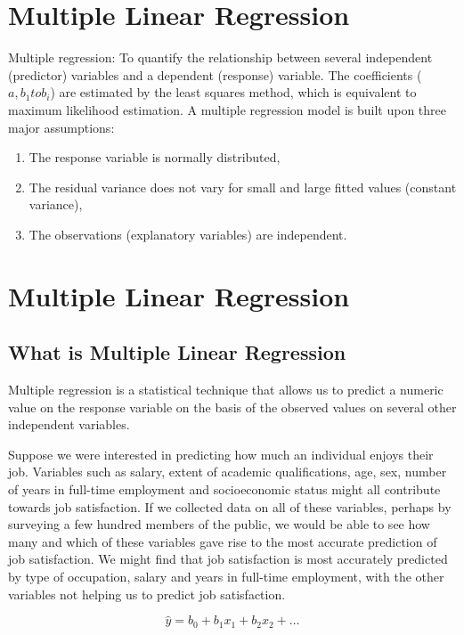 \section{Multiple Linear Regression}
Multiple regression: To quantify the relationship between several independent (predictor) variables and a dependent (response) variable. The coefficients ($a, b_{1} to b_{i}$) are estimated by the least squares method, which is equivalent to maximum likelihood estimation. A multiple regression model is built upon three major assumptions:

\begin{enumerate}
\item The response variable is normally distributed,
\item The residual variance does not vary for small and large fitted values (constant variance),
\item The observations (explanatory variables) are independent.
\end{enumerate}





\section{Multiple Linear Regression}
\subsection{What is Multiple Linear Regression}

Multiple regression is a statistical technique that allows us to predict a numeric value on the response variable on the basis of the observed values on several other independent variables.

Suppose we were interested in predicting how much an individual enjoys their job. Variables such as salary, extent of academic qualifications, age, sex, number of years in full-time employment and socioeconomic status might all contribute towards job satisfaction. If we collected data on all of these variables, perhaps by surveying a few hundred members of the public, we would be able to see how many and which of these variables gave rise to the most accurate prediction of job satisfaction. We might find that job satisfaction is most accurately predicted by type of occupation, salary and years in full-time employment, with the other variables not helping us to predict job satisfaction.

\[\hat{y} = b_0 + b_1x_1 + b_2x_2 + \ldots \]

